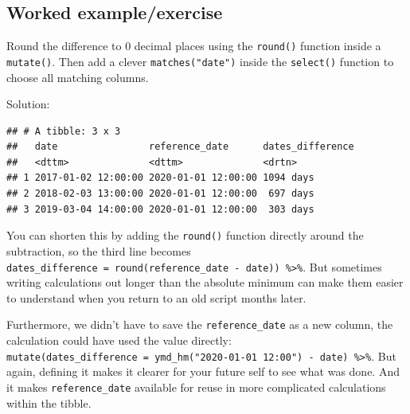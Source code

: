 \documentclass[
  12pt,
  krantz2]{krantz}
\makeatletter
\newenvironment{Shaded}{\begin{snugshade}}{\end{snugshade}}
\newcommand{\DataTypeTok}[1]{\textcolor[rgb]{0.13,0.29,0.53}{#1}}
\newcommand{\KeywordTok}[1]{\textcolor[rgb]{0.13,0.29,0.53}{\textbf{#1}}}
\newcommand{\NormalTok}[1]{#1}
\newcommand{\OperatorTok}[1]{\textcolor[rgb]{0.81,0.36,0.00}{\textbf{#1}}}
\newcommand{\StringTok}[1]{\textcolor[rgb]{0.31,0.60,0.02}{#1}}
\newenvironment{kframe}{%
\medskip{}
\setlength{\fboxsep}{.8em}
 \def\at@end@of@kframe{}%
 \ifinner\ifhmode%
  \def\at@end@of@kframe{\end{minipage}}%
  \begin{minipage}{\columnwidth}%
 \fi\fi%
 \def\FrameCommand##1{\hskip\@totalleftmargin \hskip-\fboxsep
 \colorbox{shadecolor}{##1}\hskip-\fboxsep
     \hskip-\linewidth \hskip-\@totalleftmargin \hskip\columnwidth}%
 \MakeFramed {\advance\hsize-\width
   \@totalleftmargin\z@ \linewidth\hsize
   \@setminipage}}%
 {\par\unskip\endMakeFramed%
 \at@end@of@kframe}
\renewenvironment{Shaded}{\begin{kframe}}{\end{kframe}}
\makeatother
\begin{document}
\hypertarget{worked-exampleexercise}{%
\subsection{Worked example/exercise}\label{worked-exampleexercise}}

Round the difference to 0 decimal places using the \texttt{round()} function inside a \texttt{mutate()}.
Then add a clever \texttt{matches("date")} inside the \texttt{select()} function to choose all matching columns.


Solution:

\begin{Shaded}
\end{Shaded}

\begin{verbatim}
## # A tibble: 3 x 3
##   date                reference_date      dates_difference
##   <dttm>              <dttm>              <drtn>          
## 1 2017-01-02 12:00:00 2020-01-01 12:00:00 1094 days       
## 2 2018-02-03 13:00:00 2020-01-01 12:00:00  697 days       
## 3 2019-03-04 14:00:00 2020-01-01 12:00:00  303 days
\end{verbatim}

You can shorten this by adding the \texttt{round()} function directly around the subtraction, so the third line becomes \texttt{dates\_difference\ =\ round(reference\_date\ -\ date))\ \%\textgreater{}\%}.
But sometimes writing calculations out longer than the absolute minimum can make them easier to understand when you return to an old script months later.

Furthermore, we didn't have to save the \texttt{reference\_date} as a new column, the calculation could have used the value directly: \texttt{mutate(dates\_difference\ =\ ymd\_hm("2020-01-01\ 12:00")\ -\ date)\ \%\textgreater{}\%}.
But again, defining it makes it clearer for your future self to see what was done. And it makes \texttt{reference\_date} available for reuse in more complicated calculations within the tibble.
\end{document}
